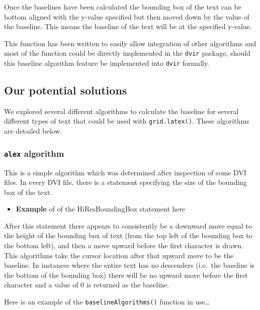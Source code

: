 \documentclass[]{article}
\newenvironment{Shaded}{\begin{snugshade}}{\end{snugshade}}
\newcommand{\KeywordTok}[1]{\textcolor[rgb]{0.13,0.29,0.53}{\textbf{#1}}}
\newcommand{\DataTypeTok}[1]{\textcolor[rgb]{0.13,0.29,0.53}{#1}}
\newcommand{\CharTok}[1]{\textcolor[rgb]{0.31,0.60,0.02}{#1}}
\newcommand{\StringTok}[1]{\textcolor[rgb]{0.31,0.60,0.02}{#1}}
\newcommand{\NormalTok}[1]{#1}
\providecommand{\tightlist}{%
  \setlength{\itemsep}{0pt}\setlength{\parskip}{0pt}}
\begin{document}
Once the baselines have been calculated the bounding box of the text can
be bottom aligned with the y-value specified but then moved down by the
value of the baseline. This means the baseline of the text will be at
the specified y-value.

This function has been written to easily allow integration of other
algorithms and most of the function could be directly implemented in the
\texttt{dvir} package, should this baseline algorithm feature be
implemented into \texttt{dvir} formally.

\subsection{Our potential solutions}\label{our-potential-solutions}

We explored several different algorithms to calculate the baseline for
several different types of text that could be used with
\texttt{grid.latex()}. These algorithms are detailed below.

\subsubsection{\texorpdfstring{\texttt{alex}
algorithm}{alex algorithm}}\label{alex-algorithm}

This is a simple algorithm which was determined after inspection of some
DVI files. In every DVI file, there is a statement specifying the size
of the bounding box of the text.

\begin{itemize}
\tightlist
\item
  \textbf{Example} of of the HiResBoundingBox statement here
\end{itemize}

After this statement there appears to consistently be a downward move
equal to the height of the bounding box of text (from the top left of
the bounding box to the bottom left), and then a move upward before the
first character is drawn. This algorithms take the cursor location after
that upward move to be the baseline. In instances where the entire text
has no descenders (i.e.~the baseline is the bottom of the bounding box)
there will be no upward move before the first character and a value of 0
is returned as the baseline.

Here is an example of the \texttt{baselineAlgorithms()} function in
use\ldots{}

\begin{Shaded}
\end{Shaded}
\end{document}
